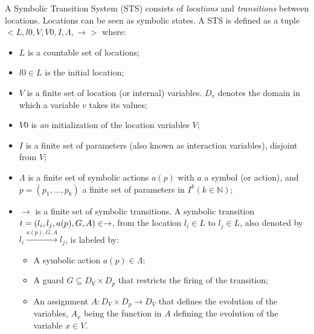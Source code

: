 \begin{definition}
    A Symbolic Transition System (STS) consists of
    \emph{locations} and \emph{transitions} between locations.
    Locations can be seen as symbolic states.
    A STS is defined as a tuple
    $<L,l0,V,V0,I,\Lambda,\rightarrow>$ where:

    \begin{itemize}
        \item $L$ is a countable set of locations;

        \item $l0 \in L$ is the initial location;

        \item $V$ is a finite set of location (or internal)
            variables. $D_v$ denotes the domain in which a
            variable $v$ takes its values;

        \item $V0$ is \emph{an} initialization of the location
            variables $V$;

        \item $I$ is a finite set of parameters (also known as
            interaction variables), disjoint from $V$;

        \item $\Lambda$ is a finite set of symbolic actions
            $a(p)$ with $a$ a symbol (or action), and
            $p=(p_1,\dots ,p_k)$ a finite set of parameters in
            $I^{k} (k \in \mathbb{N})$;

        \item $\rightarrow$ is a finite set of symbolic
            transitions. A symbolic transition $t =
            (l_i,l_j,a(p),G,\\A) \in \rightarrow$, from the
            location $l_i \in L$ to $l_j \in L$, also denoted by
            $l_i \xrightarrow{a(p),G,A} l_j$, is labeled by:

        \begin{itemize}
            \item A symbolic action $a(p) \in \Lambda$;

            \item A guard $G \subseteq D_V \times D_p$ that
            restricts the firing of the transition;

            \item An assignment $A : D_V \times D_p \rightarrow
            D_V$ that defines the evolution of the variables,
            $A_x$ being the function in $A$ defining the
            evolution of the variable $x \in V$.
		\end{itemize}
	\end{itemize}

	\label{def:sts-orig}
\end{definition}

